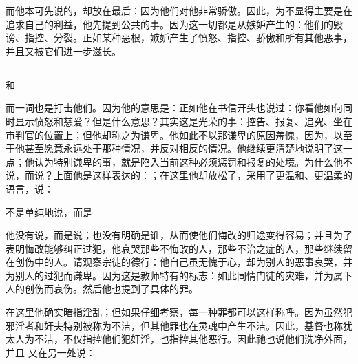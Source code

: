 \par

而他本可先说的，却放在最后：因为他们对他非常骄傲。因此，为不显得主要是在追求自己的利益，他先提到公共的事。因为这一切都是从嫉妒产生的：他们的毁谤、指控、分裂。正如某种恶根，嫉妒产生了愤怒、指控、骄傲和所有其他恶事，并且又被它们进一步滋长。\par


\subsection{}

和\par

而一词也是打击他们。因为他的意思是：正如他在书信开头也说过：你看他如何同时显示愤怒和慈爱？但是什么意思？其实这是光荣的事：控告、报复、追究、坐在审判官的位置上；但他却称之为谦卑。他如此不以那谦卑的原因羞愧，因为，以至于他甚至愿意永远处于那种情况，并反对相反的情况。他继续更清楚地说明了这一点；他认为特别谦卑的事，就是陷入当前这种必须惩罚和报复的处境。为什么他不说，而说？上面他是这样表达的：；在这里他却放松了，采用了更温和、更温柔的语言，说：\par

不是单纯地说，而是\par

他没有说，而是说；也没有明确是谁，从而使他们悔改的归途变得容易；并且为了表明悔改能够纠正过犯，他哀哭那些不悔改的人，那些不治之症的人，那些继续留在创伤中的人。请观察宗徒的德行：他自己虽无愧于心，却为别人的恶事哀哭，并为别人的过犯而谦卑。因为这是教师特有的标志：如此同情门徒的灾难，并为属下人的创伤而哀伤。然后他也提到了具体的罪。\par

在这里他确实暗指淫乱；但如果仔细考察，每一种罪都可以这样称呼。因为虽然犯邪淫者和奸夫特别被称为不洁，但其他罪也在灵魂中产生不洁。因此，基督也称犹太人为不洁，不仅指控他们犯奸淫，也指控其他恶行。因此祂也说他们洗净外面，并且 又在另一处说：\par

